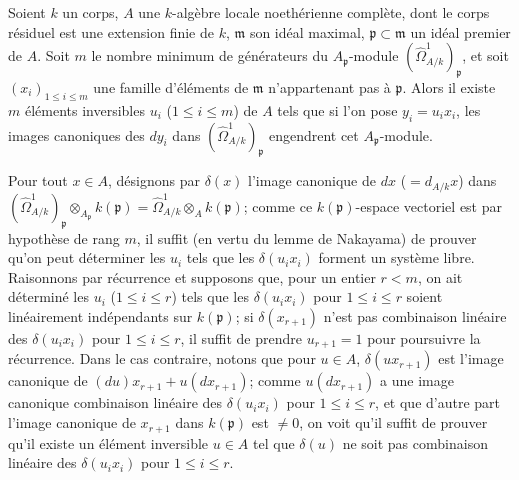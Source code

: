 \begin{lemma}[18.11.5.2]
\label{IV.18.11.5.2}
Soient $k$ un corps, $A$ une $k$-algèbre locale noethérienne complète, dont le corps résiduel est une extension finie de $k$, $\mathfrak m$ son idéal maximal, $\mathfrak p\subset\mathfrak m$ un idéal premier de $A$. Soit $m$ le nombre minimum de générateurs du $A_{\mathfrak p}$-module $(\hat{\Omega}^1_{A/k})_{\mathfrak p}$, et soit $(x_i)_{1\leq i\leq m}$ une famille d'éléments de $\mathfrak m$ n'appartenant pas à $\mathfrak p$. Alors il existe $m$ éléments inversibles $u_i$ ($1\leq i\leq m$) de $A$ tels que si l'on pose $y_i=u_ix_i$, les images canoniques des $dy_i$ dans $(\hat{\Omega}^1_{A/k})_{\mathfrak p}$ engendrent cet $A_{\mathfrak p}$-module.
\end{lemma}

Pour tout $x\in A$, désignons par $\delta(x)$ l'image canonique de $dx$ ($=d_{A/k}x$) dans $(\hat{\Omega}^1_{A/k})_{\mathfrak p}\otimes_{A_{\mathfrak p}}k(\mathfrak p)=\hat{\Omega}^1_{A/k}\otimes_A k(\mathfrak p)$; comme ce $k(\mathfrak p)$-espace vectoriel est par hypothèse de rang $m$, il suffit (en vertu du lemme de Nakayama) de prouver qu'on peut déterminer les $u_i$ tels que les $\delta(u_ix_i)$ forment un système libre. Raisonnons par récurrence et supposons que, pour un entier $r<m$, on ait déterminé les $u_i$ ($1\leq i\leq r$) tels que les $\delta(u_ix_i)$ pour $1\leq i\leq r$ soient linéairement indépendants sur $k(\mathfrak p)$; si $\delta(x_{r+1})$ n'est pas combinaison linéaire des $\delta(u_ix_i)$ pour $1\leq i\leq r$, il suffit de prendre $u_{r+1}=1$ pour poursuivre la récurrence. Dans le cas contraire, notons que pour $u\in A$, $\delta(ux_{r+1})$ est l'image canonique de $(du)x_{r+1}+u(dx_{r+1})$; comme $u(dx_{r+1})$ a une image canonique combinaison linéaire des $\delta(u_ix_i)$ pour $1\leq i\leq r$, et que d'autre part l'image canonique de $x_{r+1}$ dans $k(\mathfrak p)$ est $\neq0$, on voit qu'il suffit de prouver qu'il existe un élément inversible $u\in A$ tel que $\delta(u)$ ne soit pas combinaison linéaire des $\delta(u_ix_i)$ pour $1\leq i\leq r$.

